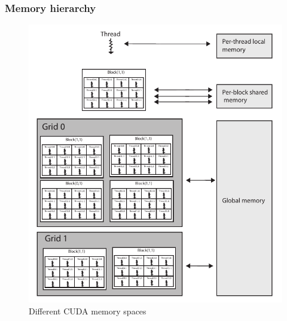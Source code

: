 \subsubsection{Memory hierarchy}
\begin{figure}[ht!]
\centering
\includegraphics[]{img/cuda2.pdf}
\caption{Different CUDA memory spaces}
\label{cudamemoryhierarchy}
\end{figure}
